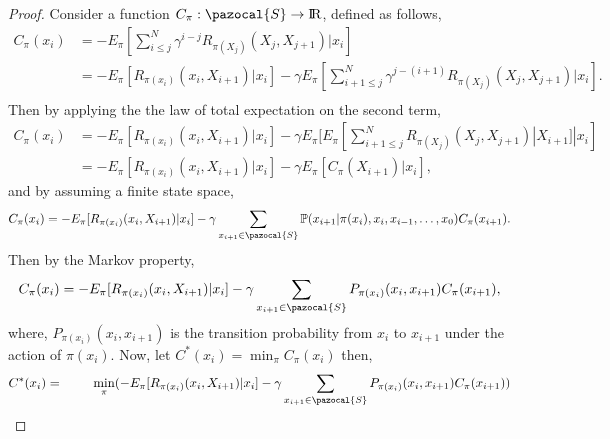\documentclass[11pt]{article}
\theoremstyle{definition}
\begin{document}
\begin{proof}
Consider a function $C_{\pi}: \pazocal{S} \rightarrow \rm I\!R$, defined as follows,
\begin{equation*}
\begin{aligned}
C_{\pi}(x_{i}) &= -E_{\pi}[ \sum_{i\leq j}^N \gamma^{i - j} R_{\pi(X_j)}(X_{j}, X_{{j+1}}) |x_{i}]\\
& = - E_{\pi}[R_{\pi(x_i)}(x_{i}, X_{{i+1}}) | x_{i}] - \gamma E_{\pi}[ \sum_{ i+1 \leq j}^N \gamma^{j-(i+1)} R_{\pi(X_j)}(X_{j}, X_{j+1}) | x_{i}].\\
\end{aligned}
\end{equation*}
Then by applying the the law of total expectation on the second term,
\begin{equation*}
\begin{aligned}
C_{\pi}(x_{{i}}) &= - E_{\pi}[R_{\pi(x_i)}(x_{i}, X_{{i+1}}) | x_{i}] - \gamma E_{\pi}[ E_{\pi}[ \sum_{ i+1 \leq j}^N R_{\pi(X_j)}(X_{j}, X_{{j+1}}) |X_{{i+1}}]| x_{i}]\\
&=  - E_{\pi}[R_{\pi(x_i)}(x_{i}, X_{{i+1}}) | x_{i}] - \gamma E_{\pi}[ C_{\pi}({X_{{i+1}}})| x_{i}],
\end{aligned}
\end{equation*}
and by assuming a finite state space,
\begin{equation*}
C_{\pi}(x_{{i}}) =  - E_{\pi}[R_{\pi(x_i)}(x_{i}, X_{{i+1}}) | x_{i}]  - \gamma \sum_{x_{i+1} \in \pazocal{S}} \mathbb P(x_{i+1}|\pi(x_i), x_{i}, x_{i-1},\dots, x_{0}) C_{\pi}({x_{{i+1}}}).\\
\end{equation*}
Then by the Markov property,
\begin{equation*}
\begin{aligned}
C_{\pi}(x_{i}) &=  - E_{\pi}[R_{\pi(x_i)}(x_{i}, X_{{i+1}}) | x_{i}] - \gamma \sum_{x_{i+1} \in \pazocal{S}} P_{\pi(x_{i})}(x_{i},x_{i+1}) C_{\pi}({x_{{i+1}}}),\\
\end{aligned}
\end{equation*}
where, $P_{\pi(x_{i})}(x_{i},x_{i+1}) $ is the transition probability from $x_i$ to $x_{i+1}$ under the action of $\pi(x_i)$. 
Now, let $C^*(x_{i}) = \min_{\pi} C_{\pi}(x_{{i}})$ then,
\begin{equation}\label{equ_proof1}
\begin{aligned}
C^{*}(x_{{i}}) &=  ~~~~~~~ \min_{\pi}(- E_{\pi}[R_{\pi(x_i)}(x_{i}, X_{{i+1}}) | x_{i}] - \gamma \sum_{x_{i+1} \in \pazocal{S}} P_{\pi(x_{i})}(x_{i},x_{i+1}) C_{\pi}({x_{{i+1}}}))\\

\end{aligned}
\end{equation}
\end{proof}
\end{document}
